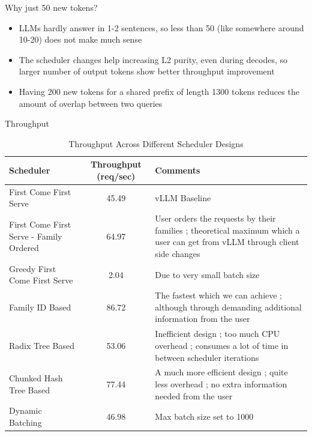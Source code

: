 \documentclass[Serif, 10pt, brown]{beamer}
\theoremstyle{example}
\theoremstyle{plain}
\begin{document}
\begin{frame}{Why just 50 new tokens?}
    \begin{itemize}
        \item LLMs hardly answer in 1-2 sentences, so less than 50 (like somewhere around 10-20) does not make much sense
        \item The scheduler changes help increasing L2 purity, even during decodes, so larger number of output tokens show better throughput improvement
        \item Having 200 new tokens for a shared prefix of length 1300 tokens reduces the amount of overlap between two queries
    \end{itemize}
\end{frame}

\begin{frame}{Throughput}
\begin{table}[h!]
\centering
\scriptsize
\begin{tabular}{|p{2.5cm}|c|p{4cm}|}
\hline
\textbf{Scheduler} & \textbf{Throughput (req/sec)} & \textbf{Comments} \\
\hline
    First Come First Serve & 45.49 & vLLM Baseline \\
    First Come First Serve - Family Ordered & 64.97 & User orders the requests by their families ; theoretical maximum which a user can get from vLLM through client side changes \\
    Greedy First Come First Serve & 2.04 & Due to very small batch size \\
    Family ID Based & 86.72 & The fastest which we can achieve ; although through demanding additional information from the user \\
    Radix Tree Based & 53.06 & Inefficient design ; too much CPU overhead ; consumes a lot of time in between scheduler iterations \\
    Chunked Hash Tree Based & 77.44 & A much more efficient design ; quite less overhead ; no extra information needed from the user \\
    Dynamic Batching & 46.98 & Max batch size set to 1000 \\
\hline
\end{tabular}
\caption{Throughput Across Different Scheduler Designs}
\end{table}

\end{frame}
\end{document}
